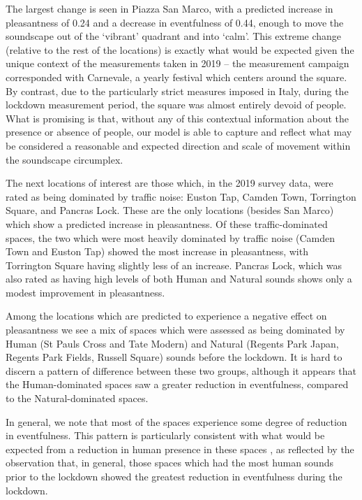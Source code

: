 The largest change is seen in Piazza San Marco, with a predicted increase in pleasantness of 0.24 and a decrease in eventfulness of 0.44, enough to move the soundscape out of the ‘vibrant’ quadrant and into ‘calm’. This extreme change (relative to the rest of the locations) is exactly what would be expected given the unique context of the measurements taken in 2019 – the measurement campaign corresponded with Carnevale, a yearly festival which centers around the square. By contrast, due to the particularly strict measures imposed in Italy, during the lockdown measurement period, the square was almost entirely devoid of people. What is promising is that, without any of this contextual information about the presence or absence of people, our model is able to capture and reflect what may be considered a reasonable and expected direction and scale of movement within the soundscape circumplex.

The next locations of interest are those which, in the 2019 survey data, were rated as being dominated by traffic noise: Euston Tap, Camden Town, Torrington Square, and Pancras Lock. These are the only locations (besides San Marco) which show a predicted increase in pleasantness. Of these traffic-dominated spaces, the two which were most heavily dominated by traffic noise (Camden Town and Euston Tap) showed the most increase in pleasantness, with Torrington Square having slightly less of an increase. Pancras Lock, which was also rated as having high levels of both Human and Natural sounds shows only a modest improvement in pleasantness.

Among the locations which are predicted to experience a negative effect on pleasantness we see a mix of spaces which were assessed as being dominated by Human (St Pauls Cross and Tate Modern) and Natural (Regents Park Japan, Regents Park Fields, Russell Square) sounds before the lockdown. It is hard to discern a pattern of difference between these two groups, although it appears that the Human-dominated spaces saw a greater reduction in eventfulness, compared to the Natural-dominated spaces. 

In general, we note that most of the spaces experience some degree of reduction in  eventfulness. This pattern is particularly consistent with what would be expected from a reduction in human presence in these spaces \citep{aletta_towards_2018}, as reflected by the observation that, in general, those spaces which had the most human sounds prior to the lockdown showed the greatest reduction in eventfulness during the lockdown. 

